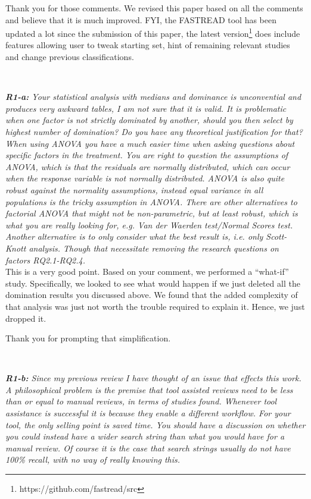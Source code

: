 \documentclass{svjour3}
\theoremstyle{break}
\newcommand{\review}[1]{{\textit{#1}}~\\}
\begin{document}
Thank you for those comments. We revised this paper based on all the comments and believe that it is much improved. FYI, the FASTREAD tool has been updated a lot since the submission of this paper, the latest version\footnote{https://github.com/fastread/src} does include features allowing user to tweak starting set, hint of remaining relevant studies and change previous classifications.
\par ~

\review{\textbf{R1-a:} Your statistical analysis with medians and dominance is unconvential and produces very awkward tables, I am not sure that it is valid. It is problematic when one factor is not strictly dominated by another, should you then select by highest number of domination? Do you have any theoretical justification for that? When using ANOVA you have a much easier time when asking questions about specific factors in the treatment. You are right to question the assumptions of ANOVA, which is that the residuals are normally distributed, which can occur when the response variable is not normally distributed. ANOVA is also quite robust against the normality assumptions, instead equal variance in all populations is the tricky assumption in ANOVA. There are other alternatives to factorial ANOVA that might not be non-parametric, but at least robust, which is what you are really looking for, e.g. Van der Waerden test/Normal Scores test. Another alternative is to only consider what the best
result is, i.e. only Scott-Knott analysis. Though that necessitate removing the research questions on factors RQ2.1-RQ2.4.
}

This is a very good point. Based on your comment, we performed a ``what-if'' study. Specifically, we looked to see what would happen if we just deleted all the domination results you discussed above. We found that the added complexity of that analysis was just not worth the trouble required to explain it. Hence, we just dropped it. 

Thank you for prompting that simplification.

\par ~

\review{\textbf{R1-b:} Since my previous review I have thought of an issue that effects this work. A philosophical problem is the premise that tool assisted reviews need to be less than or equal to manual reviews, in terms of studies found. Whenever tool assistance is successful it is because they enable a different workflow. For your tool, the only selling point is saved time. You should have a discussion on whether you could instead have a wider search string than what you would have for a manual review. Of course it is the case that search strings usually do not have 100\% recall, with no way of really knowing this.
}
\end{document}
